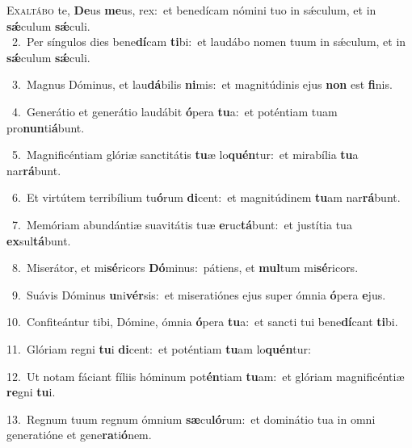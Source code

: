 \lettrine{\initial\textcolor{\initialcolor}{E}}{xaltábo} te, \textbf{De}\-us \textbf{me}\-us, rex:~\star et benedícam nómini tuo in sǽculum, et in \textbf{sǽ}\-culum \textbf{sǽ}\-culi.\\
{\numbfont\textcolor{\numbcolor}{~2.}}~Per síngulos dies bene\-\textbf{dí}\-cam \textbf{ti}\-bi:~\star et laudábo nomen tuum in sǽculum, et in \textbf{sǽ}\-culum \textbf{sǽ}\-culi.\par
{\numbfont\textcolor{\numbcolor}{~3.}}~Magnus Dóminus, et lau\-\textbf{dá}\-bilis \textbf{ni}\-mis:~\star et magnitúdinis ejus \textbf{non} est \textbf{fi}\-nis.\par
{\numbfont\textcolor{\numbcolor}{~4.}}~Generátio et generátio laudábit \textbf{ó}\-pera \textbf{tu}\-a:~\star et poténtiam tuam pro\-\textbf{nun}\-ti\-\textbf{á}\-bunt.\par
{\numbfont\textcolor{\numbcolor}{~5.}}~Magnificéntiam glóriæ sanctitátis \textbf{tu}\-æ lo\-\textbf{quén}\-tur:~\star et mirabília \textbf{tu}\-a nar\-\textbf{rá}\-bunt.\par
{\numbfont\textcolor{\numbcolor}{~6.}}~Et virtútem terribílium tu\-\textbf{ó}\-rum \textbf{di}\-cent:~\star et magnitúdinem \textbf{tu}\-am nar\-\textbf{rá}\-bunt.\par
{\numbfont\textcolor{\numbcolor}{~7.}}~Memóriam abundántiæ suavitátis tuæ \textbf{e}\-ruc\-\textbf{tá}\-bunt:~\star et justítia tua \textbf{ex}\-sul\-\textbf{tá}\-bunt.\par
{\numbfont\textcolor{\numbcolor}{~8.}}~Miserátor, et mi\-\textbf{sé}\-ricors \textbf{Dó}\-minus:~\star pátiens, et \textbf{mul}\-tum mi\-\textbf{sé}\-ricors.\par
{\numbfont\textcolor{\numbcolor}{~9.}}~Suávis Dóminus \textbf{u}\-ni\-\textbf{vér}\-sis:~\star et miseratiónes ejus super ómnia \textbf{ó}\-pera \textbf{e}\-jus.\par
{\numbfont\textcolor{\numbcolor}{10.}}~Confiteántur tibi, Dómine, ómnia \textbf{ó}\-pera \textbf{tu}\-a:~\star et sancti tui bene\-\textbf{dí}\-cant \textbf{ti}\-bi.\par
{\numbfont\textcolor{\numbcolor}{11.}}~Glóriam regni \textbf{tu}\-i \textbf{di}\-cent:~\star et poténtiam \textbf{tu}\-am lo\-\textbf{quén}\-tur:\par
{\numbfont\textcolor{\numbcolor}{12.}}~Ut notam fáciant fíliis hóminum pot\-\textbf{én}\-tiam \textbf{tu}\-am:~\star et glóriam magnificéntiæ \textbf{re}\-gni \textbf{tu}\-i.\par
{\numbfont\textcolor{\numbcolor}{13.}}~Regnum tuum regnum ómnium \textbf{sæ}\-cu\-\textbf{ló}\-rum:~\star et dominátio tua in omni generatióne et gene\-\textbf{ra}\-ti\-\textbf{ó}\-nem.\par
